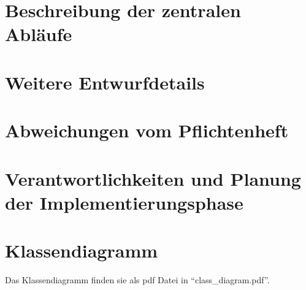 \documentclass[a4paper,10pt]{article}
\begin{document}
\section{Beschreibung der zentralen Abläufe}
\section{Weitere Entwurfdetails}
\section{Abweichungen vom Pflichtenheft}
\section{Verantwortlichkeiten und Planung der Implementierungsphase}
\section{Klassendiagramm}
Das Klassendiagramm finden sie als pdf Datei in "`class\_diagram.pdf"'.
\end{document}
